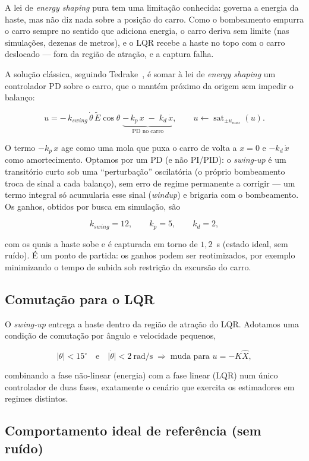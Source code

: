 \documentclass[brazil, 12pt]{article}
\begin{document}
A lei de \emph{energy shaping} pura tem uma limitação conhecida: governa a
energia da haste, mas não diz nada sobre a posição do carro. Como o
bombeamento empurra o carro sempre no sentido que adiciona energia, o carro
deriva sem limite (nas simulações, dezenas de metros), e o LQR recebe a haste
no topo com o carro deslocado --- fora da região de atração, e a captura
falha.

A solução clássica, seguindo Tedrake~\cite{mit}, é somar à lei de
\emph{energy shaping} um controlador PD sobre o carro, que o mantém próximo da
origem sem impedir o balanço:

\[
\boxed{\;u = -\,k_{swing}\,\dot{\theta}\,\tilde{E}\cos\theta
\;\underbrace{-\,k_p\,x\;-\;k_d\,\dot{x}}_{\text{PD no carro}},
\qquad u \leftarrow \operatorname{sat}_{\pm u_{max}}(u).\;}
\]

O termo $-k_p\,x$ age como uma mola que puxa o carro de volta a $x=0$ e
$-k_d\,\dot{x}$ como amortecimento. Optamos por um PD (e não PI/PID): o
\emph{swing-up} é um transitório curto sob uma ``perturbação'' oscilatória (o
próprio bombeamento troca de sinal a cada balanço), sem erro de regime
permanente a corrigir --- um termo integral só acumularia esse sinal
(\emph{windup}) e brigaria com o bombeamento. Os ganhos, obtidos por busca em
simulação, são

\[
k_{swing} = 12, \qquad k_p = 5, \qquad k_d = 2,
\]

com os quais a haste sobe e é capturada em torno de $1{,}2$~s (estado ideal,
sem ruído). É um ponto de partida: os ganhos podem ser reotimizados, por
exemplo minimizando o tempo de subida sob restrição da excursão do carro.

\subsection{Comutação para o LQR}

O \emph{swing-up} entrega a haste dentro da região de atração do LQR. Adotamos
uma condição de comutação por ângulo e velocidade pequenos,

\[
\lvert\theta\rvert < 15^{\circ}
\quad\text{e}\quad
\lvert\dot{\theta}\rvert < 2~\text{rad/s}
\;\Longrightarrow\;
\text{muda para } u = -K\hat{X},
\]

combinando a fase não-linear (energia) com a fase linear (LQR) num único
controlador de duas fases, exatamente o cenário que exercita os estimadores em
regimes distintos.

\subsection{Comportamento ideal de referência (sem ruído)}
\label{sec:ideal}
\end{document}
